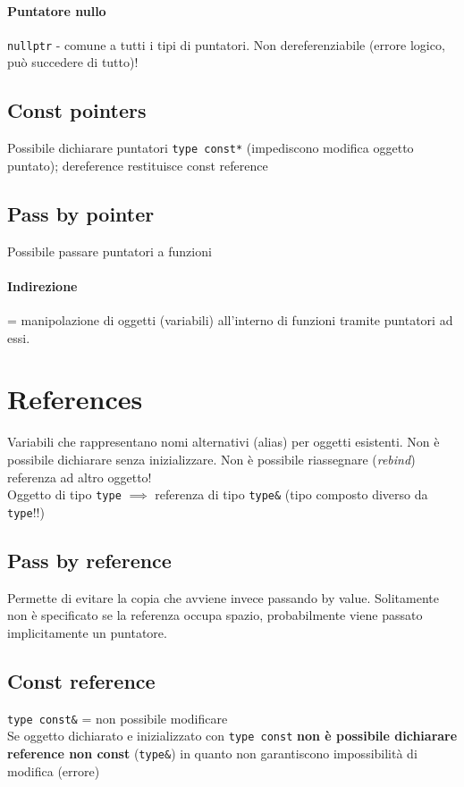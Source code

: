 \documentclass[10pt, oneside]{book}
\begin{document}
\paragraph{Puntatore nullo} \texttt{nullptr} - comune a tutti i tipi di puntatori. Non dereferenziabile (errore logico, può succedere di tutto)!

\subsection{Const pointers}
Possibile dichiarare puntatori \texttt{type const*} (impediscono modifica oggetto puntato); dereference restituisce const reference

\subsection{Pass by pointer}
Possibile passare puntatori a funzioni
\paragraph{Indirezione} = manipolazione di oggetti (variabili) all'interno di funzioni tramite puntatori ad essi.

\section{References}
Variabili che rappresentano nomi alternativi (alias) per oggetti esistenti. Non è possibile dichiarare senza inizializzare. Non è possibile riassegnare (\textit{rebind}) referenza ad altro oggetto!\\
Oggetto di tipo \texttt{type} $\implies$ referenza di tipo \texttt{type\&} (tipo composto diverso da \texttt{type}!!)

\subsection{Pass by reference}
Permette di evitare la copia che avviene invece passando by value. Solitamente non è specificato se la referenza occupa spazio, probabilmente viene passato implicitamente un puntatore.

\subsection{Const reference}
\texttt{type const\&} = non possibile modificare\\
Se oggetto dichiarato e inizializzato con \texttt{type const} \textbf{non è possibile dichiarare reference non const} (\texttt{type\&}) in quanto non garantiscono impossibilità di modifica (errore)
\end{document}
